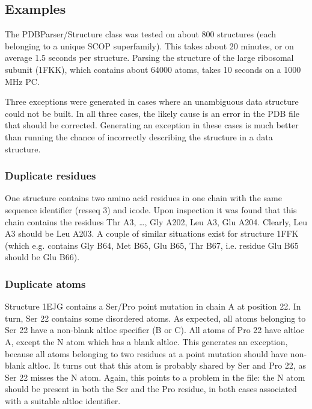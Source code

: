 \documentclass{report}
\begin{document}
\subsection{Examples\label{problem structures}}

The PDBParser/Structure class was tested on about 800 structures (each belonging
to a unique SCOP superfamily). This takes about 20 minutes, or on average 1.5
seconds per structure. Parsing the structure of the large ribosomal subunit
(1FKK), which contains about 64000 atoms, takes 10 seconds on a 1000 MHz PC.

Three exceptions were generated in cases where an unambiguous data structure
could not be built. In all three cases, the likely cause is an error in the
PDB file that should be corrected. Generating an exception in these cases
is much better than running the chance of incorrectly describing
the structure in a data structure.

\subsubsection{Duplicate residues}

One structure contains two amino acid residues in one chain with the same sequence
identifier (resseq 3) and icode. Upon inspection it was found that this chain
contains the residues Thr A3, \ldots{}, Gly A202, Leu A3, Glu A204. Clearly,
Leu A3 should be Leu A203. A couple of similar situations exist for structure
1FFK (which e.g. contains Gly B64, Met B65, Glu B65, Thr B67, i.e. residue Glu
B65 should be Glu B66).

\subsubsection{Duplicate atoms}

Structure 1EJG contains a Ser/Pro point mutation in chain A at position 22.
In turn, Ser 22 contains some disordered atoms. As expected, all atoms belonging
to Ser 22 have a non-blank altloc specifier (B or C). All atoms of Pro 22 have
altloc A, except the N atom which has a blank altloc. This generates an exception,
because all atoms belonging to two residues at a point mutation should have
non-blank altloc. It turns out that this atom is probably shared by Ser and
Pro 22, as Ser 22 misses the N atom. Again, this points to a problem in the
file: the N atom should be present in both the Ser and the Pro residue, in both
cases associated with a suitable altloc identifier.
\end{document}
